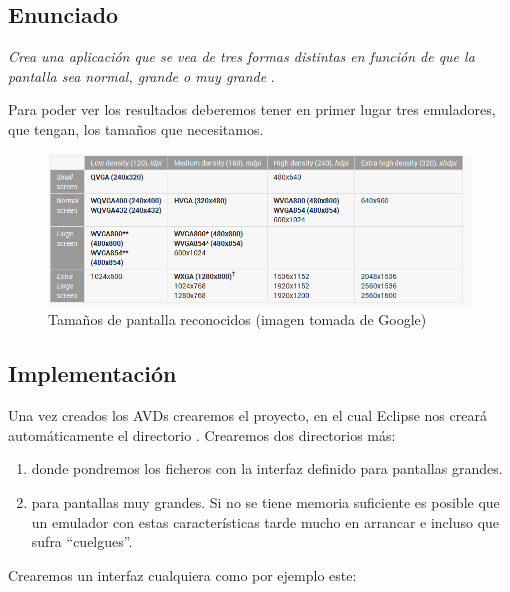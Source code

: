 \documentclass[a4paper,12pt,spanish]{sphinxmanual}
\begin{document}
\subsection{Enunciado}
\label{tema1:enunciado}
\emph{Crea una aplicación que se vea de tres formas distintas en función de que la pantalla sea normal, grande o muy grande} .

Para poder ver los resultados deberemos tener en primer lugar tres emuladores, que tengan, los tamaños que necesitamos.
\begin{figure}[htbp]
\centering
\capstart

\includegraphics{tamaniospantalla.png}
\caption{Tamaños de pantalla reconocidos (imagen tomada de Google)}\end{figure}


\subsection{Implementación}
\label{tema1:implementacion}
Una vez creados los AVDs crearemos el proyecto, en el cual Eclipse nos creará automáticamente el directorio . Crearemos dos directorios más:
\begin{enumerate}
\item {} 
 donde pondremos los ficheros con la interfaz definido para pantallas grandes.

\item {} 
 para pantallas muy grandes. Si no se tiene memoria suficiente es posible que un emulador con estas características tarde mucho en arrancar e incluso que sufra ``cuelgues''.

\end{enumerate}

Crearemos un interfaz cualquiera como por ejemplo este:
\end{document}
